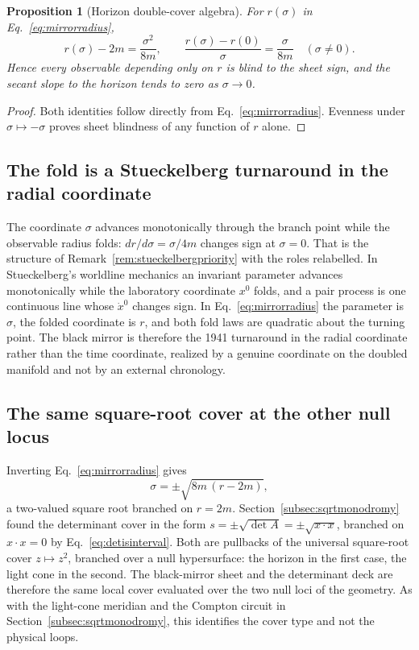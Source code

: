 \documentclass[11pt]{article}
\newtheorem{proposition}[theorem]{Proposition}
\theoremstyle{definition}\newtheorem{definition}[theorem]{Definition}
\theoremstyle{remark}\newtheorem{remark}[theorem]{Remark}\newtheorem{conjecture}[theorem]{Conjecture}
\begin{document}
\begin{proposition}[Horizon double-cover algebra]\label{prop:horizoncover}
For $r(\sigma)$ in Eq.~\eqref{eq:mirrorradius},
\begin{equation}
 r(\sigma)-2m=\frac{\sigma^2}{8m},\qquad
 \frac{r(\sigma)-r(0)}{\sigma}=\frac{\sigma}{8m}\quad(\sigma\neq0).
\end{equation}
Hence every observable depending only on $r$ is blind to the sheet sign, and the secant slope to the horizon tends to zero as $\sigma\to0$.
\end{proposition}
\begin{proof}
Both identities follow directly from Eq.~\eqref{eq:mirrorradius}. Evenness under $\sigma\mapsto-\sigma$ proves sheet blindness of any function of $r$ alone.
\end{proof}

\subsection{The fold is a Stueckelberg turnaround in the radial coordinate}\label{subsec:mirrorstueckelberg}
The coordinate $\sigma$ advances monotonically through the branch point while the observable radius folds: $dr/d\sigma=\sigma/4m$ changes sign at $\sigma=0$. That is the structure of Remark~\ref{rem:stueckelbergpriority} with the roles relabelled. In Stueckelberg's worldline mechanics an invariant parameter advances monotonically while the laboratory coordinate $x^0$ folds, and a pair process is one continuous line whose $\dot x^0$ changes sign. In Eq.~\eqref{eq:mirrorradius} the parameter is $\sigma$, the folded coordinate is $r$, and both fold laws are quadratic about the turning point. The black mirror is therefore the 1941 turnaround in the radial coordinate rather than the time coordinate, realized by a genuine coordinate on the doubled manifold and not by an external chronology.

\subsection{The same square-root cover at the other null locus}\label{subsec:mirrorsqrt}
Inverting Eq.~\eqref{eq:mirrorradius} gives
\begin{equation}\label{eq:mirrorsqrt}
 \sigma=\pm\sqrt{8m\,(r-2m)},
\end{equation}
a two-valued square root branched on $r=2m$. Section~\ref{subsec:sqrtmonodromy} found the determinant cover in the form $s=\pm\sqrt{\det A}=\pm\sqrt{x\cdot x}$, branched on $x\cdot x=0$ by Eq.~\eqref{eq:detisinterval}. Both are pullbacks of the universal square-root cover $z\mapsto z^2$, branched over a null hypersurface: the horizon in the first case, the light cone in the second. The black-mirror sheet and the determinant deck are therefore the same local cover evaluated over the two null loci of the geometry. As with the light-cone meridian and the Compton circuit in Section~\ref{subsec:sqrtmonodromy}, this identifies the cover type and not the physical loops.
\end{document}
